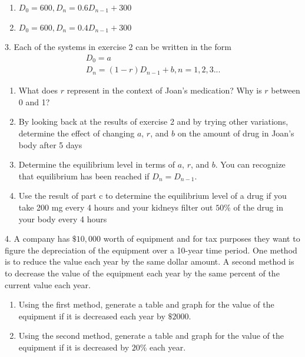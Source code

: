 \documentclass[10pt,]{book}
\theoremstyle{plain}
\theoremstyle{definition}
\theoremstyle{definition}
\theoremstyle{definition}
\numberwithin{equation}{section}
\begin{document}
\begin{exerciselist}
\begin{enumerate}[label=(\alph*)]
\item\hypertarget{li-13}{}\(D_0=600, D_n=0.6D_{n-1} + 300\)%
\item\hypertarget{li-14}{}\(D_0=600, D_n=0.4D_{n-1} + 300\)%
\end{enumerate}
%
\par\smallskip
\item[3.]\hypertarget{exercise-5}{}Each of the systems in exercise 2 can be written in the form%
\begin{gather*}
D_0=a\\
D_n=(1-r) D_{n-1}+b, n=1,2,3...
\end{gather*}
\leavevmode%
\begin{enumerate}[label=(\alph*)]
\item\hypertarget{li-15}{}What does \(r\) represent in the context of Joan's medication?  Why is \(r\) between 0 and 1?%
\item\hypertarget{li-16}{}By looking back at the results of exercise 2 and by trying other variations, determine the effect of changing \(a\), \(r\), and \(b\) on the amount of drug in Joan's body after 5 days%
\item\hypertarget{li-17}{}Determine the equilibrium level in terms of \(a\), \(r\), and \(b\).  You can recognize that equilibrium has been reached if  \(D_n=D_{n-1}\).%
\item\hypertarget{li-18}{}Use the result of part c to determine the equilibrium level of a drug if you take 200 mg every 4 hours and your kidneys filter out \(50\%\) of the drug in your body every 4 hours%
\end{enumerate}
%
\par\smallskip
\item[4.]\hypertarget{exercise-6}{}A company has \(\$10,000\) worth of equipment and for tax purposes they want to figure the depreciation of the equipment over a 10-year time period.  One method is to reduce the value each year by the same dollar amount.  A second method is to decrease the value of the equipment each year by the same percent of the current value each year. \leavevmode%
\begin{enumerate}[label=(\alph*)]
\item\hypertarget{li-19}{}Using the first method, generate a table and graph for the value of the equipment if it is  decreased each year by \(\$2000\).%
\item\hypertarget{li-20}{}Using the second method, generate a table and graph for the value of the equipment if it is decreased by \(20\%\) each year.%

\end{enumerate}
\end{exerciselist}
\end{document}
